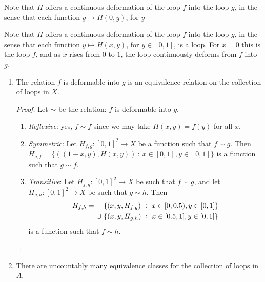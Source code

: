 Note that $H$ offers a continuous deformation of the loop $f$ into the loop $g$, in the sense that each
function $y \to H(0, y)$, for $y$

Note that $H$ offers a continuous deformation of the loop $f$ into the loop $g$, in the sense that each
function $y \mapsto H(x, y)$, for $y \in [0, 1]$, is a loop. For $x = 0$ this is the loop $f$, and as $x$ rises
from $0$ to $1$, the loop continuously deforms from $f$ into $g$.

\begin{enumerate}[label=(\alph*)]

\item
  \begin{claim*}
    The relation $f$ is deformable into $g$ is an equivalence relation on the collection of loops in $X$.
  \end{claim*}

  \begin{proof}
    Let $\sim$ be the relation: $f$ is deformable into $g$.
    \begin{enumerate}

    \item {\it Reflexive}: yes, $f \sim f$ since we may take $H(x, y) = f(y)$ for all $x$.

    \item {\it Symmetric}: Let $H_{f,g}: [0, 1]^2 \to X$ be a function such that $f \sim g$.
      Then $H_{g,f} = \{((1 - x, y), H(x, y)) ~:~ x \in [0, 1], y \in [0, 1]\}$ is a function such
      that $g \sim f$.

    \item {\it Transitive}: Let $H_{f,g}: [0, 1]^2 \to X$ be such that $f \sim g$, and let
      $H_{g,h}: [0, 1]^2 \to X$ be such that $g \sim h$. Then
      \begin{align*}
        H_{f, h} =
        ~~~~&\{ (x, y, H_{f, g}) ~:~ x \in [0, 0.5), y \in [0, 1]\} \\
        ~~~~\cup ~&\{ (x, y, H_{g, h}) ~:~ x \in [0.5, 1], y \in [0, 1]\}
      \end{align*}
      is a function such that $f \sim h$.
    \end{enumerate}
  \end{proof}

\item
  \begin{claim*}
    There are uncountably many equivalence classes for the collection of loops in $A$.
  \end{claim*}



\end{enumerate}
